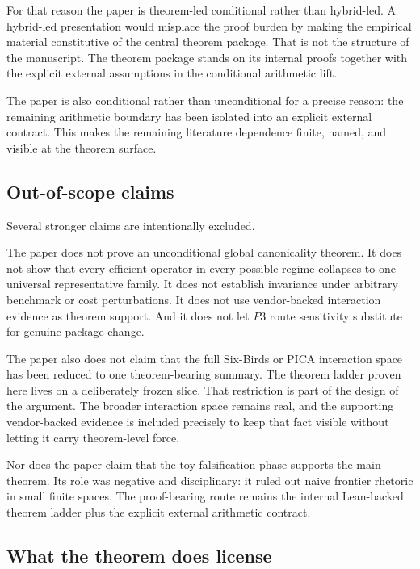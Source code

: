 \documentclass[11pt]{article}
\begin{document}
For that reason the paper is theorem-led conditional rather than hybrid-led. A
hybrid-led presentation would misplace the proof burden by making the empirical
material constitutive of the central theorem package. That is not the structure
of the manuscript. The theorem package stands on its internal proofs together
with the explicit external assumptions in the conditional arithmetic lift.

The paper is also conditional rather than unconditional for a precise reason:
the remaining arithmetic boundary has been isolated into an explicit external
contract. This makes the remaining literature dependence finite, named, and
visible at the theorem surface.

\subsection*{Out-of-scope claims}

Several stronger claims are intentionally excluded.

The paper does not prove an unconditional global canonicality theorem. It does
not show that every efficient operator in every possible regime collapses to one
universal representative family. It does not establish invariance under
arbitrary benchmark or cost perturbations. It does not use vendor-backed
interaction evidence as theorem support. And it does not let \(P3\) route
sensitivity substitute for genuine package change.

The paper also does not claim that the full Six-Birds or PICA interaction space
has been reduced to one theorem-bearing summary. The theorem ladder proven here
lives on a deliberately frozen slice. That restriction is part of the design of
the argument. The broader interaction space remains real, and the supporting
vendor-backed evidence is included precisely to keep that fact visible without
letting it carry theorem-level force.

Nor does the paper claim that the toy falsification phase supports the main
theorem. Its role was negative and disciplinary: it ruled out naive frontier
rhetoric in small finite spaces. The proof-bearing route remains the internal
Lean-backed theorem ladder plus the explicit external arithmetic contract.

\subsection*{What the theorem does license}
\end{document}
